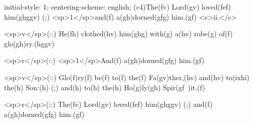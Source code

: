 initial-style: 1;
centering-scheme: english;
(c4)The(fv) Lord(gv) loved(fef) him(ghggv) (;) <sp>1</sp>and(f) a(gh)dorned(gfg) him.(gf) <c>ii.</c>

<sp>v</sp>(::) He(fh) clothed(hv) him(ghg) with(g) a(hv) robe(g) of(f) glo(gh)ry.(hggv)

<sp>r</sp>(::) <sp>1</sp>And(f) a(gh)dorned(gfg) him.(gf)

<sp>v</sp>(::) Glo(f)ry(f) be(f) to(f) the(f) Fa(gv)ther,(hv) and(hv) to(ixhi) the(h) Son:(h) (;) and(h) to(h) the(h) Ho(g)ly(gh) Spir(gf~)it.(f)

<sp>r</sp>(::) The(fv) Lord(gv) loved(fef) him(ghggv) (;) and(f) a(gh)dorned(gfg) him.(gf)